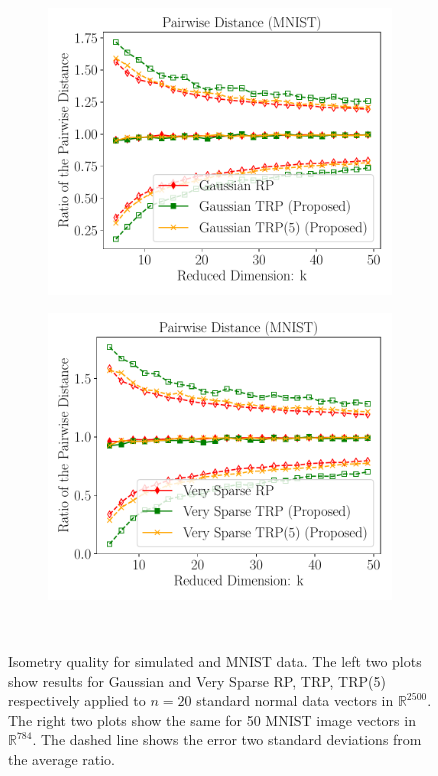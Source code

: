 \begin{figure}[H]
\begin{subfigure}{0.24\textwidth}
		\includegraphics[scale = 0.22]{figure/dist_g_mnist.pdf}
	\end{subfigure}
	\begin{subfigure}{0.24\textwidth}
		\includegraphics[scale = 0.22]{figure/dist_sp1_mnist.pdf}
	\end{subfigure}\\
	\caption{Isometry quality for simulated and MNIST data.
		The left two plots show results for Gaussian and Very Sparse RP, TRP, TRP(5)
		respectively applied to $n = 20$ standard normal data vectors in $\mathbb{R}^{2500}$.
		The right two plots show the same for 50 MNIST image vectors in $\mathbb{R}^{784}$.
		The dashed line shows the error two standard deviations from the average ratio.}
	\label{fig:main}
\end{figure}

